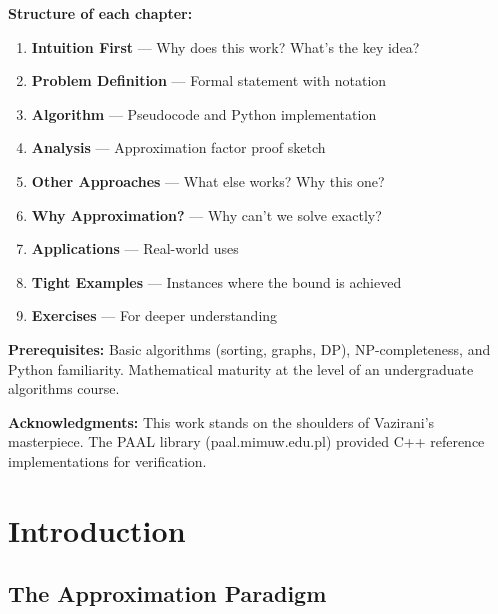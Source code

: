 \documentclass[11pt,oneside]{book}
\begin{document}
\vspace{1em}

\noindent \textbf{Structure of each chapter:}
\begin{enumerate}
    \item \textbf{Intuition First} — Why does this work? What's the key idea?
    \item \textbf{Problem Definition} — Formal statement with notation
    \item \textbf{Algorithm} — Pseudocode and Python implementation
    \item \textbf{Analysis} — Approximation factor proof sketch
    \item \textbf{Other Approaches} — What else works? Why this one?
    \item \textbf{Why Approximation?} — Why can't we solve exactly?
    \item \textbf{Applications} — Real-world uses
    \item \textbf{Tight Examples} — Instances where the bound is achieved
    \item \textbf{Exercises} — For deeper understanding
\end{enumerate}

\vspace{1em}

\noindent \textbf{Prerequisites:} Basic algorithms (sorting, graphs, DP), NP-completeness, and Python familiarity. Mathematical maturity at the level of an undergraduate algorithms course.

\vspace{1em}

\noindent \textbf{Acknowledgments:} This work stands on the shoulders of Vazirani's masterpiece. The PAAL library (paal.mimuw.edu.pl) provided C++ reference implementations for verification.

\tableofcontents

\mainmatter

\setcounter{chapter}{0}
\chapter{Introduction}
\label{ch:intro}

\section{The Approximation Paradigm}
\end{document}
